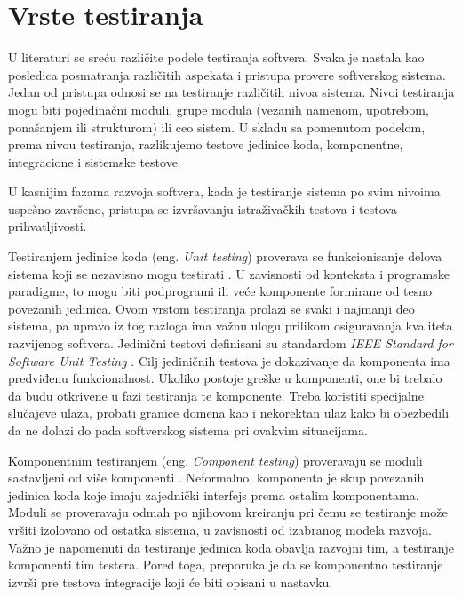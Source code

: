\documentclass[12pt,oneside]{memoir}
\begin{document}
\section{Vrste testiranja} \label{broj2}

U literaturi se sreću različite podele testiranja softvera. Svaka je nastala kao posledica posmatranja različitih aspekata i pristupa provere softverskog sistema.
Jedan od pristupa odnosi se na testiranje različitih nivoa sistema. Nivoi testiranja mogu biti pojedinačni moduli, grupe modula (vezanih namenom, upotrebom, ponašanjem ili strukturom) ili ceo sistem.
U skladu sa pomenutom podelom, prema nivou testiranja, razlikujemo testove jedinice koda, komponentne, integracione i sistemske testove.
\par
U kasnijim fazama razvoja softvera, kada je testiranje sistema po svim nivoima uspešno završeno, pristupa se izvršavanju istraživačkih testova i testova prihvatljivosti.
\par

Testiranjem jedinice koda (eng. \textit{Unit testing}) proverava se funkcionisanje delova sistema koji se nezavisno mogu testirati \cite{SoftwareUnitTesting}. U zavisnosti od konteksta i programske paradigme, to mogu biti podprogrami ili veće komponente formirane od tesno povezanih jedinica. Ovom vrstom testiranja prolazi se svaki i najmanji deo sistema, pa upravo iz tog razloga ima važnu ulogu prilikom osiguravanja kvaliteta razvijenog softvera. Jedinični testovi definisani su standardom \textit{IEEE Standard for Software Unit Testing} \cite{IEEEStandard}. Cilj jediničnih testova je dokazivanje da komponenta ima predviđenu funkcionalnost. Ukoliko postoje greške u komponenti, one bi trebalo da budu otkrivene u fazi testiranja te komponente. Treba koristiti specijalne slučajeve ulaza, probati granice domena kao i nekorektan ulaz kako bi obezbedili da ne dolazi do pada softverskog sistema pri ovakvim situacijama.
\par
Komponentnim testiranjem (eng. \textit{Component testing}) proveravaju se moduli sastavljeni od više komponenti \cite{ComponentTesting}. Neformalno, komponenta je skup povezanih jedinica koda koje imaju zajednički interfejs prema ostalim komponentama.  Moduli se proveravaju odmah po njihovom kreiranju pri čemu se testiranje može vršiti izolovano od ostatka sistema, u zavisnosti od izabranog modela razvoja. Važno je napomenuti da testiranje jedinica koda obavlja razvojni tim, a testiranje komponenti tim testera. Pored toga, preporuka je da se komponentno testiranje izvrši pre testova integracije koji će biti opisani u nastavku.
\par
\end{document}

